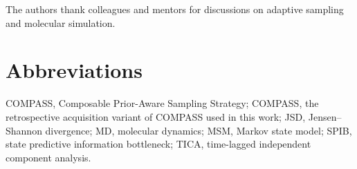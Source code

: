 \documentclass[journal=jctcce,manuscript=article,layout=twocolumn]{achemso}
\begin{document}
The authors thank colleagues and mentors for discussions on adaptive sampling and molecular simulation.

\section*{Abbreviations}
COMPASS, Composable Prior-Aware Sampling Strategy; COMPASS, the retrospective acquisition variant of COMPASS used in this work; JSD, Jensen--Shannon divergence; MD, molecular dynamics; MSM, Markov state model; SPIB, state predictive information bottleneck; TICA, time-lagged independent component analysis.


\end{document}
